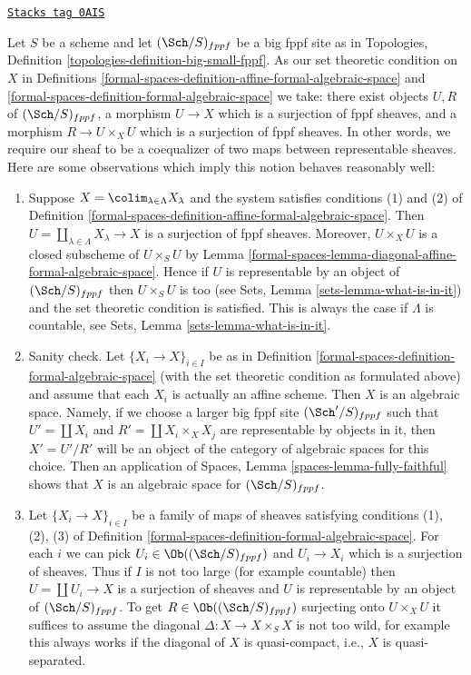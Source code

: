 \begin{remark}
\label{formal-spaces-remark-set-theoretic}
\href{https://stacks.math.columbia.edu/tag/0AIS}{\texttt{Stacks tag 0AIS}}

Let $S$ be a scheme and let $(\Sch/S)_{fppf}$ be a big fppf site as
in Topologies, Definition \ref{topologies-definition-big-small-fppf}.
As our set theoretic condition on $X$ in
Definitions \ref{formal-spaces-definition-affine-formal-algebraic-space} and
\ref{formal-spaces-definition-formal-algebraic-space} we take:
there exist objects $U, R$ of $(\Sch/S)_{fppf}$, a
morphism $U \to X$ which is a surjection of fppf sheaves, and
a morphism $R \to U \times_X U$ which is a surjection of fppf sheaves.
In other words, we require our sheaf to be a coequalizer of
two maps between representable sheaves.
Here are some observations which imply this notion behaves
reasonably well:
\begin{enumerate}
\item Suppose $X = \colim_{\lambda \in \Lambda} X_\lambda$
and the system satisfies conditions (1) and (2) of
Definition \ref{formal-spaces-definition-affine-formal-algebraic-space}. Then
$U = \coprod_{\lambda \in \Lambda} X_\lambda \to X$ is a surjection
of fppf sheaves. Moreover, $U \times_X U$ is a closed subscheme
of $U \times_S U$ by Lemma \ref{formal-spaces-lemma-diagonal-affine-formal-algebraic-space}.
Hence if $U$ is representable by an object of $(\Sch/S)_{fppf}$
then $U \times_S U$ is too (see Sets, Lemma \ref{sets-lemma-what-is-in-it})
and the set theoretic condition is satisfied. This is always the case
if $\Lambda$ is countable, see Sets, Lemma \ref{sets-lemma-what-is-in-it}.
\item Sanity check. Let $\{X_i \to X\}_{i \in I}$ be as in
Definition \ref{formal-spaces-definition-formal-algebraic-space}
(with the set theoretic condition as formulated above)
and assume that each $X_i$ is actually an affine scheme.
Then $X$ is an algebraic space. Namely, if we choose a larger
big fppf site $(\Sch'/S)_{fppf}$ such that $U' = \coprod X_i$
and $R' = \coprod X_i \times_X X_j$ are representable by objects
in it, then $X' = U'/R'$ will be an object of the category
of algebraic spaces for this choice. Then an application of
Spaces, Lemma \ref{spaces-lemma-fully-faithful} shows that
$X$ is an algebraic space for $(\Sch/S)_{fppf}$.
\item Let $\{X_i \to X\}_{i \in I}$ be a family of maps of sheaves
satisfying conditions (1), (2), (3) of
Definition \ref{formal-spaces-definition-formal-algebraic-space}.
For each $i$ we can pick $U_i \in \Ob((\Sch/S)_{fppf})$
and $U_i \to X_i$ which is a surjection of sheaves.
Thus if $I$ is not too large (for example countable) then
$U = \coprod U_i \to X$ is a surjection of sheaves and
$U$ is representable by an object of $(\Sch/S)_{fppf}$.
To get $R \in \Ob((\Sch/S)_{fppf})$ surjecting onto $U \times_X U$
it suffices to assume the diagonal $\Delta : X \to X \times_S X$ is not
too wild, for example this always works if the diagonal of $X$ is
quasi-compact, i.e., $X$ is quasi-separated.
\end{enumerate}
\end{remark}

